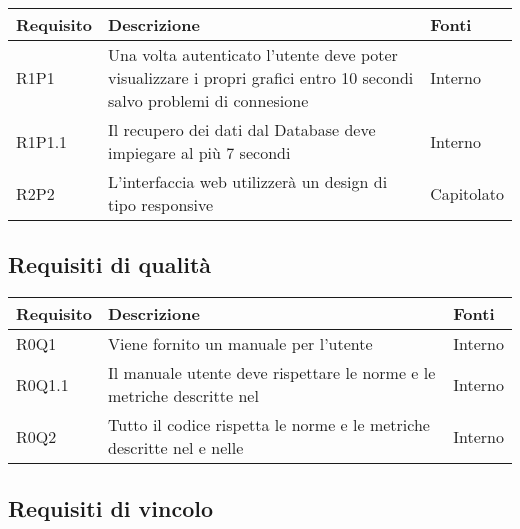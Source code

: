 \begin{center}

	\def\arraystretch{1.5}
	\bgroup
	\begin{longtable}{| p{2cm} | p{8cm} | p{2cm} |}

		\hline
		\textbf{Requisito} & \textbf{Descrizione} & \textbf{Fonti} \\
		\hline

		R1P1  &  Una volta autenticato l'utente deve poter visualizzare i propri grafici entro 10 secondi salvo problemi di connesione &  Interno \\
		\hline
		R1P1.1  &  Il recupero dei dati dal Database deve impiegare al più 7 secondi  &  Interno \\
		\hline
		R2P2  &  L'interfaccia web utilizzerà un design di tipo responsive  &  Capitolato \\
		\hline

	\end{longtable}
	\egroup
\end{center}

\subsection{Requisiti di qualità}

\begin{center}

	\def\arraystretch{1.5}
	\bgroup
	\begin{longtable}{| p{2cm} | p{8cm} | p{2cm} |}

		\hline
		\textbf{Requisito} & \textbf{Descrizione} & \textbf{Fonti} \\
		\hline

		R0Q1  &  Viene fornito un manuale per l'utente  &  Interno \\
		\hline
		R0Q1.1  &  Il manuale utente deve rispettare le norme e le metriche descritte nel \docNameVersionPdQ  &  Interno \\
		\hline
		R0Q2  &  Tutto il codice rispetta le norme e le metriche descritte nel \docNameVersionPdQ{} e nelle \docNameVersionNdP  &  Interno \\
		\hline


	\end{longtable}
	\egroup
\end{center}

\subsection{Requisiti di vincolo}

